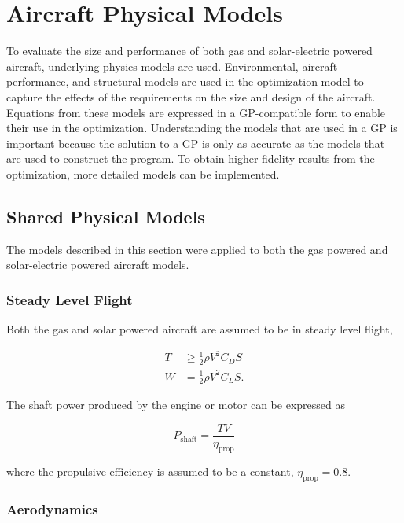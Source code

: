 
\chapter{Aircraft Physical Models}

To evaluate the size and performance of both gas and solar-electric powered aircraft, underlying physics models are used.  
Environmental, aircraft performance, and structural models are used in the optimization model to capture the effects of the requirements on the size and design of the aircraft.
Equations from these models are expressed in a GP-compatible form to enable their use in the optimization. 
Understanding the models that are used in a GP is important because the solution to a GP is only as accurate as the models that are used to construct the program.  
To obtain higher fidelity results from the optimization, more detailed models can be implemented. 

\section{Shared Physical Models}

The models described in this section were applied to both the gas powered and solar-electric powered aircraft models. 

\subsection{Steady Level Flight}

Both the gas and solar powered aircraft are assumed to be in steady level flight,\cite{hoburgthesis}

\begin{align}
    \label{e:slfthrust}
    T &\geq \frac{1}{2} \rho V^2 C_D S\\
    \label{e:slfweight}
    W &= \frac{1}{2} \rho V^2 C_L S. 
\end{align}

The shaft power produced by the engine or motor can be expressed as  

\begin{equation}
    \label{e:slfpower}
    P_{\text{shaft}} = \frac{TV}{\eta_{\text{prop}}}
    \end{equation}

    where the propulsive efficiency is assumed to be a constant, $\eta_{\text{prop}} = 0.8$. 

\subsection{Aerodynamics}

